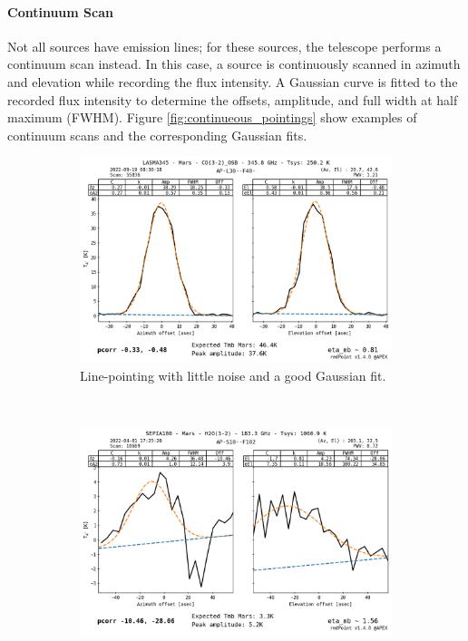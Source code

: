 \paragraph{Continuum Scan}
Not all sources have emission lines; for these sources, the telescope performs a continuum scan instead. In this case, a source is continuously scanned in azimuth and elevation while recording the flux intensity.
A Gaussian curve is fitted to the recorded flux intensity to determine the offsets, amplitude, and full width at half maximum (FWHM).
Figure \ref{fig:continueous_pointings} show examples of continuum scans and the corresponding Gaussian fits.

\begin{figure}[H]
    \centering
     \begin{subfigure}[b]{0.75\textwidth}
         \centering
         \includegraphics[width=\textwidth]{Pointing Scans/good_continuous.png}
         \caption{Line-pointing with little noise and a good Gaussian fit.}
         \label{subfig:good_continuous}
     \end{subfigure}
    \\
     \begin{subfigure}[b]{0.75\textwidth}
         \centering
         \includegraphics[width=\textwidth]{Pointing Scans/bad_continuous.png}

\end{subfigure}
\end{figure}
